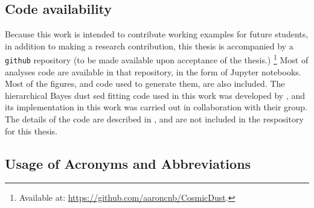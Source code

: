   \subsection{Code availability}
    Because this work is intended to contribute working examples for future students, in addition to making a research contribution, this thesis is accompanied by a {\tt github} repository (to be made available upon acceptance of the thesis.) \footnote{Available at: \url{https://github.com/aaroncnb/CosmicDust}.} Most of analyses code are available in that repository, in the form of Jupyter notebooks. Most of the figures, and code used to generate them, are also included. The hierarchical Bayes dust \acrshort{sed} fitting code used in this work was developed by \cite{galliano18}, and its implementation in this work was carried out in collaboration with their group. The details of the code are described in \cite{galliano18}, and are not included in the respository for this thesis.

  \subsection{Usage of Acronyms and Abbreviations}
